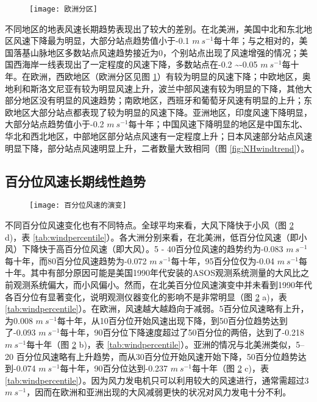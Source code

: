 \begin{figure}[!b]
    \centering
    \texttt{[image: 欧洲分区]}
    \label{fig:EU}
\end{figure}

不同地区的地表风速长期趋势表现出了较大的差别。在北美洲，美国中北和东北地区风速下降最为明显，大部分站点趋势值小于-0.1 $m ~ s^{-1}$每十年；与之相对的，美国落基山脉地区多数站点风速趋势接近为0，个别站点出现了风速增强的情况；美国西海岸一线表现出了一定程度的风速下降，多数站点在-0.2 \textasciitilde -0.05 $m ~ s^{-1}$每十年。在欧洲，西欧地区（欧洲分区见图 \ref{fig:EU}）有较为明显的风速下降；中欧地区，奥地利和斯洛文尼亚有较为明显风速上升，波兰中部风速有较为明显的下降，其他大部分地区没有明显的风速趋势；南欧地区，西班牙和葡萄牙风速有明显的上升；东欧地区大部分站点都表现了较为明显的风速下降。亚洲地区，印度风速下降明显，大部分站点趋势值小于-0.2 $m ~ s^{-1}$每十年；中国风速下降明显的地区是中国东北、华北和西北地区，中部地区部分站点风速有一定程度上升；日本风速部分站点风速明显下降，部分站点风速明显上升，二者数量大致相同（图 \ref{fig:NHwindtrend}）。

\subsection{百分位风速长期线性趋势}

\begin{figure}[!b]
    \centering
    \texttt{[image: 百分位风速的演变]}
    \label{fig:windpercentile}
\end{figure}

不同百分位风速变化也有不同特点。全球平均来看，大风下降快于小风（图 \ref{fig:windpercentile} d)，表 \ref{tab:windpercentile}）。各大洲分别来看，在北美洲，低百分位风速（即小风）下降快于高百分位风速（即大风）。5 - 40百分位风速的趋势约为-0.083 $m ~ s^{-1}$每十年，而80百分位风速趋势为-0.072 $m ~ s^{-1}$每十年，95百分位仅为-0.04 $m ~ s^{-1}$每十年。其中有部分原因可能是美国1990年代安装的ASOS观测系统测量的大风比之前观测系统偏大，而小风偏小\citep{mckee2000climate}。然而，在北美百分位风速演变中并未看到1990年代各百分位有显著变化，说明观测仪器变化的影响不是非常明显（图 \ref{fig:windpercentile} a)，表 \ref{tab:windpercentile}）。在欧洲，风速越大越趋向于减弱。5百分位风速略有上升，为0.008 $m ~ s^{-1}$每十年，从10百分位开始风速出现下降，到50百分位趋势达到了-0.093 $m ~ s^{-1}$每十年，90百分位下降速度超过了50百分位的两倍，达到了-0.218 $m ~ s^{-1}$每十年（图 \ref{fig:windpercentile} b)，表 \ref{tab:windpercentile}）。亚洲的情况与北美洲类似，5–20 百分位风速略有上升趋势，而从30百分位开始风速开始下降，50百分位趋势达到-0.074 $m ~ s^{-1}$每十年，90百分位达到-0.237 $m ~s^{-1}$每十年（图 \ref{fig:windpercentile} c)，表 \ref{tab:windpercentile}）。因为风力发电机只可以利用较大的风速进行，通常需超过3 $m ~s^{-1}$，因而在欧洲和亚洲出现的大风减弱更快的状况对风力发电十分不利。



